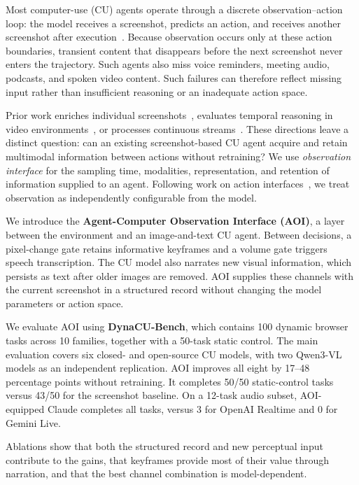 \documentclass[letterpaper]{article} %
\begin{document}
Most computer-use (CU) agents operate through a discrete observation--action
loop: the model receives a screenshot, predicts an action, and receives another
screenshot after execution~\citep{osworld,webarena,webvoyager}. Because
observation occurs only at these action boundaries, transient content that
disappears before the next screenshot never enters the trajectory.
Such agents also miss voice reminders, meeting audio, podcasts, and spoken
video content.
Such failures can therefore reflect missing input rather than insufficient
reasoning or an inadequate action space.

Prior work enriches individual screenshots~\citep{webarena,mind2web,setofmark,seeact},
evaluates temporal reasoning in video
environments~\citep{guiworld,videowebarena,videogamebench,cuasuite}, or processes continuous
streams~\citep{geminilive,openairealtime}. These directions leave a distinct
question: can an existing screenshot-based CU agent acquire and retain
multimodal information between actions without retraining? We use
\emph{observation interface} for the sampling time, modalities, representation,
and retention of information supplied to an agent. Following work on action
interfaces~\citep{sweagent}, we treat observation as independently configurable
from the model.

We introduce the \textbf{Agent-Computer Observation Interface (AOI)}, a layer
between the environment and an image-and-text CU agent. Between decisions, a
pixel-change gate retains informative keyframes and a volume gate triggers
speech transcription. The CU model also narrates new visual information, which
persists as text after older images are removed. AOI supplies these channels
with the current screenshot in a structured record without changing the model
parameters or action space.

We evaluate AOI using \textbf{DynaCU-Bench}, which contains 100 dynamic browser
tasks across 10 families, together with a 50-task static control. The main
evaluation covers six closed- and open-source CU models, with
two Qwen3-VL models as an independent replication. AOI improves all eight by
17--48 percentage points without retraining. It completes 50/50 static-control
tasks versus 43/50 for the screenshot baseline. On a 12-task audio subset,
AOI-equipped Claude completes all tasks, versus 3 for OpenAI Realtime and 0 for
Gemini Live.

Ablations show that both the structured record and new perceptual input
contribute to the gains, that keyframes provide most of their value through
narration, and that the best channel combination is model-dependent.
\end{document}
